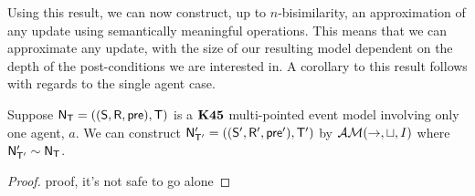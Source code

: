 %
%
%
%

Using this result, we can now construct, up to $n$-bisimilarity, an
approximation of any update using semantically meaningful operations.
This means that we can approximate any update, with the size of our resulting
model dependent on the depth of the post-conditions we are interested in.
A corollary to this result follows with regards to the single agent case.

\begin{corr}
  Suppose $\mathrm{\mathsf{N}}_\mathrm{\mathsf{T}} = ((\mathrm{\mathsf{S}},\mathrm{\mathsf{R}},\mathrm{\mathsf{pre}}),\mathrm{\mathsf{T}})$ is a $\bf K45$ multi-pointed
  event model involving only one agent, $a$.
  We can construct $\mathrm{\mathsf{N}}'_{\mathrm{\mathsf{T}}'} = ((\mathrm{\mathsf{S}}',\mathrm{\mathsf{R}}',\mathrm{\mathsf{pre}}'),\mathrm{\mathsf{T}}')$ by
  $\mathcal{AM}(\to,\sqcup,I)$ where $\mathrm{\mathsf{N}}'_{\mathrm{\mathsf{T}}'} \sim \mathrm{\mathsf{N}}_\mathrm{\mathsf{T}}$.
\end{corr}
\begin{proof}
	\FIXME proof, it's not safe to go alone
\end{proof}
